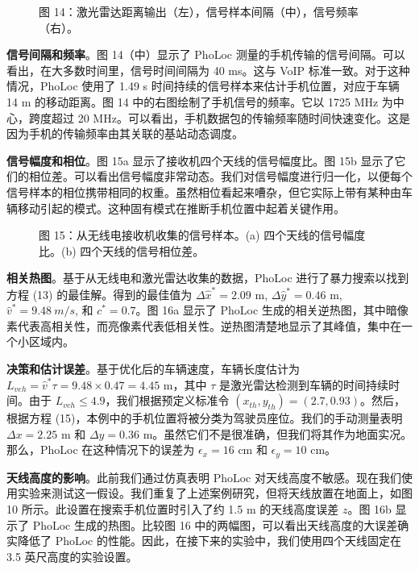\documentclass[journal, onecolumn]{IEEEtran}
\begin{document}
\begin{figure}[htbp]
\centering
\caption{图 14：激光雷达距离输出（左），信号样本间隔（中），信号频率（右）。}
\label{fig:14}
\end{figure}

\textbf{信号间隔和频率}。图 14（中）显示了 PhoLoc 测量的手机传输的信号间隔。可以看出，在大多数时间里，信号时间间隔为 40 ms。这与 VoIP 标准一致。对于这种情况，PhoLoc 使用了 1.49 s 时间持续的信号样本来估计手机位置，对应于车辆 14 m 的移动距离。图 14 中的右图绘制了手机信号的频率。它以 1725 MHz 为中心，跨度超过 20 MHz。可以看出，手机数据包的传输频率随时间快速变化。这是因为手机的传输频率由其关联的基站动态调度。

\textbf{信号幅度和相位}。图 15a 显示了接收机四个天线的信号幅度比。图 15b 显示了它们的相位差。可以看出信号幅度非常动态。我们对信号幅度进行归一化，以便每个信号样本的相位携带相同的权重。虽然相位看起来嘈杂，但它实际上带有某种由车辆移动引起的模式。这种固有模式在推断手机位置中起着关键作用。

\begin{figure}[htbp]
\centering
\caption{图 15：从无线电接收机收集的信号样本。(a) 四个天线的信号幅度比。(b) 四个天线的信号相位差。}
\label{fig:15}
\end{figure}

\textbf{相关热图}。基于从无线电和激光雷达收集的数据，PhoLoc 进行了暴力搜索以找到方程 (13) 的最佳解。得到的最佳值为 $\Delta\hat{x}^{*}=2.09$ m, $\Delta\hat{y}^{*}=0.46$ m, $\hat{v}^{*}=9.48~m/s$, 和 $c^{*}=0.7$。图 16a 显示了 PhoLoc 生成的相关逆热图，其中暗像素代表高相关性，而亮像素代表低相关性。逆热图清楚地显示了其峰值，集中在一个小区域内。

\textbf{决策和估计误差}。基于优化后的车辆速度，车辆长度估计为 $L_{veh}=\hat{v}^{*}\tau=9.48\times0.47=4.45$ m，其中 $\tau$ 是激光雷达检测到车辆的时间持续时间。由于 $L_{veh}\le4.9$，我们根据预定义标准令 $(x_{th},y_{th})=(2.7,0.93)$。然后，根据方程 (15)，本例中的手机位置将被分类为驾驶员座位。我们的手动测量表明 $\Delta x=2.25$ m 和 $\Delta y=0.36$ m。虽然它们不是很准确，但我们将其作为地面实况。那么，PhoLoc 在这种情况下的误差为 $\epsilon_{x}=16$ cm 和 $\epsilon_{y}=10$ cm。

\textbf{天线高度的影响}。此前我们通过仿真表明 PhoLoc 对天线高度不敏感。现在我们使用实验来测试这一假设。我们重复了上述案例研究，但将天线放置在地面上，如图 10 所示。此设置在搜索手机位置时引入了约 1.5 m 的天线高度误差 $z$。图 16b 显示了 PhoLoc 生成的热图。比较图 16 中的两幅图，可以看出天线高度的大误差确实降低了 PhoLoc 的性能。因此，在接下来的实验中，我们使用四个天线固定在 3.5 英尺高度的实验设置。
\end{document}
